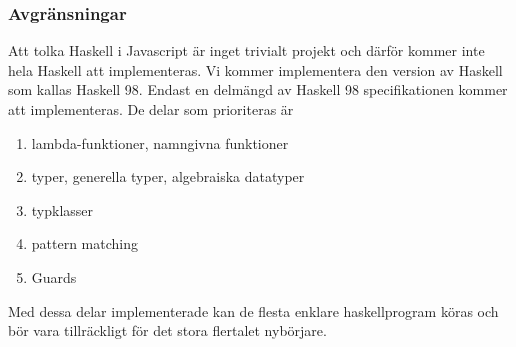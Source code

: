 \subsubsection{Avgränsningar}
Att tolka Haskell i Javascript är inget trivialt projekt och därför kommer inte hela Haskell att implementeras. Vi kommer implementera den version av Haskell som kallas Haskell 98.
Endast en delmängd av Haskell 98 specifikationen kommer att implementeras. De delar som prioriteras är
        \begin{enumerate}
            \item{lambda-funktioner, namngivna funktioner}
            \item{typer, generella typer, algebraiska datatyper}
            \item{typklasser}
            \item{pattern matching}
            \item{Guards}
            \end{enumerate}
Med dessa delar implementerade kan de flesta enklare haskellprogram köras och bör vara tillräckligt för det stora flertalet nybörjare.%

